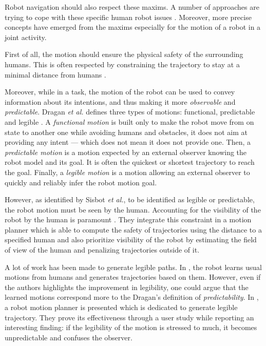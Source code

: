 \documentclass[a4paper,11pt,twoside]{StyleThese}
\begin{document}
Robot navigation should also respect these maxims. A number of approaches are trying to cope with these specific human robot issues \cite{kruse_human-aware_2013}. Moreover, more precise concepts have emerged from the maxims especially for the motion of a robot in a joint activity. 

First of all, the motion should ensure the physical safety of the surrounding humans. This is often respected by constraining the trajectory to stay at a minimal distance from humans \cite{kruse_human-aware_2013, rios2015proxemics}.

Moreover, while in a task, the motion of the robot can be used to convey information about its intentions, and thus making it more \textit{observable} and \textit{predictable}. Dragan \textit{et al.} defines three types of motions: functional, predictable and legible \cite{dragan2015effects}. A \textit{functional motion} is built only to make the robot move from on state to another one while avoiding humans and obstacles, it does not aim at providing any intent --- which does not mean it does not provide one. Then, a \textit{predictable motion} is a motion expected by an external observer knowing the robot model and its goal. It is often the quickest or shortest trajectory to reach the goal. Finally, a \textit{legible motion} is a motion allowing an external observer to quickly and reliably infer the robot motion goal.

However, as identified by Sisbot \textit{et al.}, to be identified as legible or predictable, the robot motion must be seen by the human. Accounting for the visibility of the robot by the human is paramount \cite{sisbot_human_2007}.  They integrate this constraint in a motion planner which is able to compute the safety of trajectories using the distance to a specified human and also prioritize visibility of the robot by estimating the field of view of the human and penalizing trajectories outside of it.

A lot of work has been made to generate legible paths. In \cite{beetz2010generality}, the robot learns usual motions from humans and generates trajectories based on them. However, even if the authors highlights the improvement in legibility, one could argue that the learned motions correspond more to the Dragan's definition of \textit{predictability}. In \cite{dragan_legibility_2013}, a robot motion planner is presented which is dedicated to generate legible trajectory. They prove its effectiveness through a user study while reporting an interesting finding: if the legibility of the motion is stressed to much, it becomes unpredictable and confuses the observer.
\end{document}
